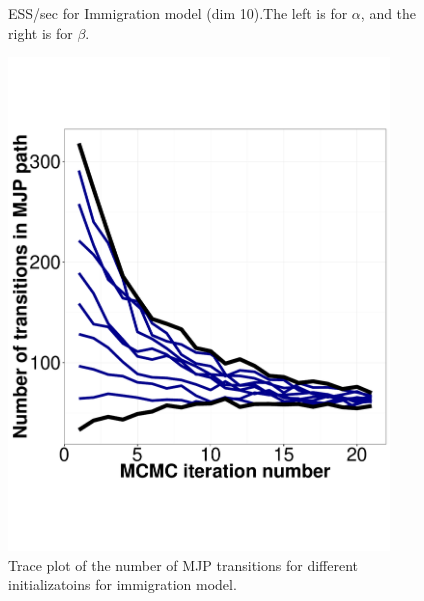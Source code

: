 \begin{figure}
\begin{minipage}[hp]{0.45\linewidth}
    \vspace{-0 in}
     \label{fig:ESS_Q_D10}
  \end{minipage}
    \caption{ESS/sec for Immigration model (dim 10).The left is for $\alpha$, and the right is for $\beta$.}
  \end{figure}

\begin{figure}
  \begin{minipage}[hp]{0.45\linewidth}
  \centering
    \includegraphics [width=0.90\textwidth, angle=0]{figs/q3_k2_path_transition.pdf}
    \vspace{-0 in}
    \caption{Trace plot of the number of MJP transitions for different initializatoins for immigration model.}
     \label{fig:ESS_Q_TRANSITION}
  \end{minipage}
\end{figure}

